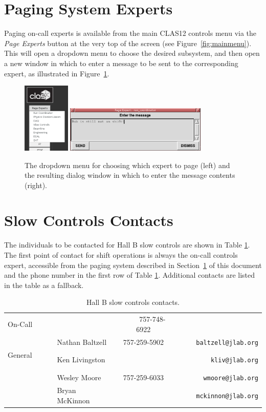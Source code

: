 \documentclass[amsmath,amssymb,notitlepage,11pt]{revtex4}
\begin{document}
\section{Paging System Experts}\label{sec:pagingexperts}
Paging on-call experts is available from the main CLAS12 controls menu via the {\em Page Experts} button at the very top of the screen (see Figure~\ref{fig:mainmenu}).  This will open a dropdown menu to choose the desired subsystem, and then open a new window in which to enter a message to be sent to the corresponding expert, as illustrated in Figure~\ref{fig:pageexpert}.
\begin{figure}[htbp]\centering
  \includegraphics[width=0.2\textwidth]{pics/pageexpert}
  \includegraphics[width=0.6\textwidth]{pics/pageexpertmsg}
  \caption{The dropdown menu for choosing which expert to page (left) and the resulting dialog window in which to enter the message contents (right).\label{fig:pageexpert}}
\end{figure}

\newpage
\section{Slow Controls Contacts}
The individuals to be contacted for Hall B slow controls are shown in Table \ref{tab:experts}.  The first point of contact for shift operations is always the on-call controls expert, accessible from the paging system described in Section~\ref{sec:pagingexperts} of this document and the phone number in the first row of Table \ref{tab:experts}.  Additional contacts are listed in the table as a fallback.

\begin{table}[htbp]\centering
    \begin{tabular}{llcr}\toprule[1.5pt]
        On-Call & & \ \ \ \ \ 757-748-6922 & \\ \cmidrule[0.5pt]{1-4}
         & Nathan Baltzell & 757-259-5902 & \ \ \ \ \ \texttt{baltzell@jlab.org} \\
         General \ \ \ \ \       & Ken Livingston  &           & \texttt{kliv@jlab.org} \\
                & Wesley Moore & 757-259-6033 &  \texttt{wmoore@jlab.org} \\
                & Bryan McKinnon & & \texttt{mckinnon@jlab.org} \\
        \bottomrule[1.5pt]
    \end{tabular}
    \caption{Hall B slow controls contacts.\label{tab:experts}}
\end{table}
\end{document}
